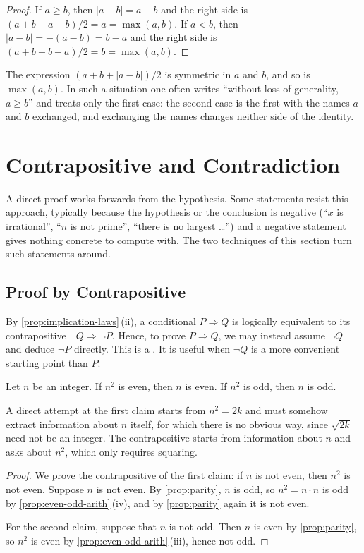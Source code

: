 \begin{proof}
If $a\ge b$, then $|a-b|=a-b$ and the right side is $(a+b+a-b)/2=a=\max(a,b)$. If $a<b$, then $|a-b|=-(a-b)=b-a$ and the right side is $(a+b+b-a)/2=b=\max(a,b)$.
\end{proof}

The expression $(a+b+|a-b|)/2$ is symmetric in $a$ and $b$, and so is $\max(a,b)$. In such a situation one often writes ``without loss of generality, $a\ge b$'' and treats only the first case: the second case is the first with the names $a$ and $b$ exchanged, and exchanging the names changes neither side of the identity.

\section{Contrapositive and Contradiction}
\label{sec:contradiction}

A direct proof works forwards from the hypothesis. Some statements resist this approach, typically because the hypothesis or the conclusion is negative (``$x$ is irrational'', ``$n$ is not prime'', ``there is no largest \ldots'') and a negative statement gives nothing concrete to compute with. The two techniques of this section turn such statements around.

\subsection{Proof by Contrapositive}

By \cref{prop:implication-laws}\,(ii), a conditional $P\Rightarrow Q$ is logically equivalent to its contrapositive $\neg Q\Rightarrow\neg P$. Hence, to prove $P\Rightarrow Q$, we may instead assume $\neg Q$ and deduce $\neg P$ directly. This is a . It is useful when $\neg Q$ is a more convenient starting point than $P$.

\begin{proposition}
\label{prop:square-even}
Let $n$ be an integer. If $n^2$ is even, then $n$ is even. If $n^2$ is odd, then $n$ is odd.
\end{proposition}

A direct attempt at the first claim starts from $n^2=2k$ and must somehow extract information about $n$ itself, for which there is no obvious way, since $\sqrt{2k}$ need not be an integer. The contrapositive starts from information about $n$ and asks about $n^2$, which only requires squaring.

\begin{proof}
We prove the contrapositive of the first claim: if $n$ is not even, then $n^2$ is not even. Suppose $n$ is not even. By \cref{prop:parity}, $n$ is odd, so $n^2=n\cdot n$ is odd by \cref{prop:even-odd-arith}\,(iv), and by \cref{prop:parity} again it is not even.

For the second claim, suppose that $n$ is not odd. Then $n$ is even by \cref{prop:parity}, so $n^2$ is even by \cref{prop:even-odd-arith}\,(iii), hence not odd.
\end{proof}

